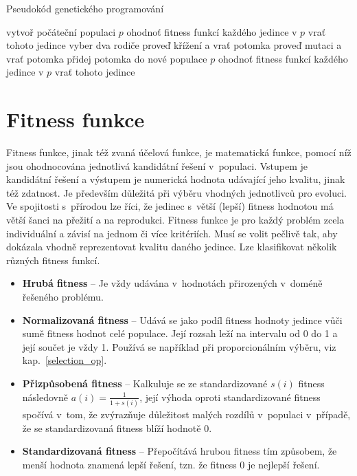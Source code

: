 \bigskip
\begin{algorithm}
\caption{Pseudokód genetického programování}\label{alg:cap}
\begin{algorithmic}
\State vytvoř počáteční populaci $p$
\State ohodnoť fitness funkcí každého jedince v $p$
    \State vrať tohoto jedince
\EndIf
{}
        \State vyber dva rodiče
            \State proveď křížení a vrať potomka
        \EndIf
            \State proveď mutaci a vrať potomka
        \EndIf
    \State přidej potomka do nové populace $p$
    \EndFor
    \State ohodnoť fitness funkcí každého jedince v $p$
    \State vrať tohoto jedince
\EndIf
\EndWhile
\end{algorithmic}
\label{alg:genetic_programing}
\end{algorithm}

\newpage
\section{Fitness funkce}
Fitness funkce, jinak též zvaná účelová funkce, je matematická funkce, pomocí níž jsou ohodnocována jednotlivá kandidátní řešení v~populaci. Vstupem je kandidátní řešení a výstupem je numerická hodnota udávající jeho kvalitu, jinak též zdatnost. Je především důležitá při výběru vhodných jednotlivců pro evoluci. Ve spojitosti s~přírodou lze říci, že jedinec s~větší (lepší) fitness hodnotou má větší šanci na přežití a na reprodukci. Fitness funkce je pro každý problém zcela individuální a závisí na jednom či více kritériích. Musí se volit pečlivě tak, aby dokázala vhodně reprezentovat kvalitu daného jedince.
Lze klasifikovat několik různých fitness funkcí.
\begin{itemize}
    \item \textbf{Hrubá fitness} -- Je vždy udávána v~hodnotách přirozených v~doméně řešeného problému.
    \item \textbf{Normalizovaná fitness} -- Udává se jako podíl fitness hodnoty jedince vůči sumě fitness hodnot celé populace. Její rozsah leží na intervalu od 0 do 1 a její součet je vždy 1. Používá se například při proporcionálním výběru, viz kap.~\ref{selection_op}. 
    \item \textbf{Přizpůsobená fitness} -- Kalkuluje se ze standardizované $s(i)$ fitness následovně $a(i) = \frac{1}{1 + s(i)}$, její výhoda oproti standardizované fitness spočívá v~tom, že zvýrazňuje důležitost malých rozdílů v~populaci v~případě, že se standardizovaná fitness blíží hodnotě 0. 
    \item \textbf{Standardizovaná fitness} -- Přepočítává hrubou fitness tím způsobem, že menší hodnota znamená lepší řešení, tzn. že fitness 0 je nejlepší řešení.
\end{itemize}

